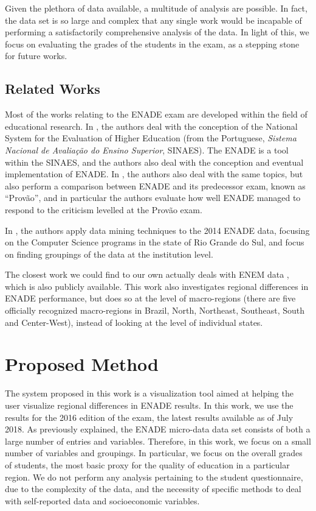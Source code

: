 \documentclass{vgtc}                          %
\begin{document}
Given the plethora of data available, a multitude of analysis are possible. In fact, the data set is so large and complex that any single work would be incapable of performing a satisfactorily comprehensive analysis of the data. In light of this, we focus on evaluating the grades of the students in the exam, as a stepping stone for future works.

\subsection{Related Works}

Most of the works relating to the ENADE exam are developed within the field of educational research. In \cite{brito2008sinaes}, the authors deal with the conception of the National System for the Evaluation of Higher Education (from the Portuguese, \emph{Sistema Nacional de Avaliação do Ensino Superior}, SINAES). The ENADE is a tool within the SINAES, and the authors also deal with the conception and eventual implementation of ENADE. In \cite{verhine2006provao}, the authors also deal with the same topics, but also perform a comparison between ENADE and its predecessor exam, known as ``Provão'', and in particular the authors evaluate how well ENADE managed to respond to the criticism levelled at the Provão exam.

In \cite{vista2017tecnicas}, the authors apply data mining techniques to the 2014 ENADE data, focusing on the Computer Science programs in the state of Rio Grande do Sul, and focus on finding groupings of the data at the institution level.

The closest work we could find to our own actually deals with ENEM data \cite{viggiano2013desempenho}, which is also publicly available. This work also investigates regional differences in ENADE performance, but does so at the level of macro-regions (there are five officially recognized macro-regions in Brazil, North, Northeast, Southeast, South and Center-West), instead of looking at the level of individual states. 

\section{Proposed Method}

The system proposed in this work is a visualization tool aimed at helping the user visualize regional differences in ENADE results. In this work, we use the results for the 2016 edition of the exam, the latest results available as of July 2018. As previously explained, the ENADE micro-data data set consists of both a large number of entries and variables. Therefore, in this work, we focus on a small number of variables and groupings. In particular, we focus on the overall grades of students, the most basic proxy for the quality of education in a particular region. We do not perform any analysis pertaining to the student questionnaire, due to the complexity of the data, and the necessity of specific methods to deal with self-reported data and socioeconomic variables.
\end{document}
